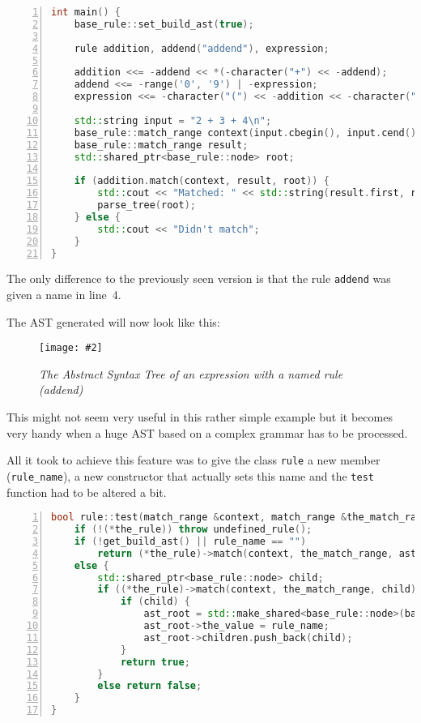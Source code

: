 \documentclass[12pt]{article}
\newcommand{\ufig}[3]{
	\begin{figure}[h!]
		\centering
			\texttt{[image: \#2]}
			\caption{\emph{#3}}
			\label{fig:#2}
	\end{figure}
}
\begin{document}
\begin{center}
	\begin{minipage}[ht]{0.85\textwidth}
		\begin{lstlisting}[language=C++, breaklines=true, numbers=left]
int main() {
	base_rule::set_build_ast(true);

	rule addition, addend("addend"), expression;

	addition <<= -addend << *(-character("+") << -addend);
	addend <<= -range('0', '9') | -expression;
	expression <<= -character("(") << -addition << -character(")");

	std::string input = "2 + 3 + 4\n";
	base_rule::match_range context(input.cbegin(), input.cend());
	base_rule::match_range result;
	std::shared_ptr<base_rule::node> root;

	if (addition.match(context, result, root)) {
		std::cout << "Matched: " << std::string(result.first, result.second);
		parse_tree(root);
	} else {
		std::cout << "Didn't match";
	}
}
		\end{lstlisting}
	\end{minipage}
\end{center}

The only difference to the previously seen version is that the rule \texttt{addend} was given a name in
line~4.

The AST generated will now look like this:

\ufig{0.7}{ast_named_rule}{The Abstract Syntax Tree of an expression with a named rule (addend)}

This might not seem very useful in this rather simple example but it becomes very handy when a huge AST based
on a complex grammar has to be processed.

All it took to achieve this feature was to give the class \texttt{rule} a new member (\texttt{rule\_name}),
a new constructor that actually sets this name and the \texttt{test} function had to be altered a bit.

\begin{center}
	\begin{minipage}[ht]{0.9\textwidth}
		\begin{lstlisting}[language=C++, breaklines=true, numbers=left]
bool rule::test(match_range &context, match_range &the_match_range, std::shared_ptr<base_rule::node> &ast_root) {
	if (!(*the_rule)) throw undefined_rule();
	if (!get_build_ast() || rule_name == "")
		return (*the_rule)->match(context, the_match_range, ast_root);
	else {
		std::shared_ptr<base_rule::node> child;
		if ((*the_rule)->match(context, the_match_range, child)) {
			if (child) {
				ast_root = std::make_shared<base_rule::node>(base_rule::node::type::named_rule);
				ast_root->the_value = rule_name;
				ast_root->children.push_back(child);
			}
			return true;
		}
		else return false;
	}
}
		\end{lstlisting}
	\end{minipage}
\end{center}
\end{document}
